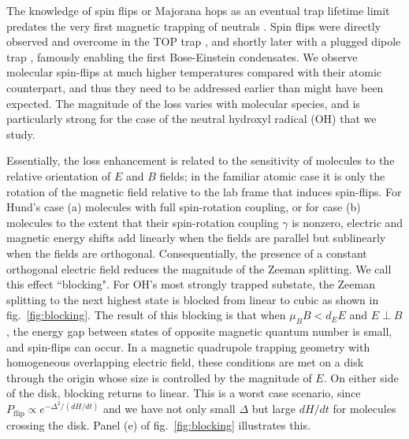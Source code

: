 \documentclass[%
 reprint,
 amsmath,amssymb,
 aps,
prl,
]{revtex4-1}
\begin{document}
The knowledge of spin flips or Majorana hops as an eventual trap lifetime limit predates the very first magnetic trapping of neutrals \cite{Migdall1985}. Spin flips were directly observed and overcome in the TOP trap \cite{Petrich1995}, and shortly later with a plugged dipole trap \cite{Davis1995}, famously enabling the first Bose-Einstein condensates. We observe molecular spin-flips at much higher temperatures compared with their atomic counterpart, and thus they need to be addressed earlier than might have been expected. The magnitude of the loss varies with molecular species, and is particularly strong for the case of the neutral hydroxyl radical (OH) that we study. 

Essentially, the loss enhancement is related to the sensitivity of molecules to the relative orientation of $E$ and $B$ fields;  in the familiar atomic case it is only the rotation of the magnetic field relative to the lab frame that induces spin-flips. For Hund's case (a) molecules with full spin-rotation coupling, or for case (b) molecules to the extent that their spin-rotation coupling $\gamma$ is nonzero, electric and magnetic energy shifts add linearly when the fields are parallel but sublinearly when the fields are orthogonal. Consequentially, the presence of a constant orthogonal electric field reduces the magnitude of the Zeeman splitting. We call this effect ``blocking". For OH's most strongly trapped substate, the Zeeman splitting to the next highest state is blocked from linear to cubic as shown in fig.~\ref{fig:blocking}.  The result of this blocking is that when $\mu_BB < d_EE$ and $E\!\perp\! B$, the energy gap between states of opposite magnetic quantum number is small, and spin-flips can occur. In a magnetic quadrupole trapping geometry with homogeneous overlapping electric field, these conditions are met on a disk through the origin whose size is controlled by the magnitude of $E$. On either side of the disk, blocking returns to linear. This is a worst case scenario, since $P_{\text{flip}}\propto e^{-\Delta^2/(dH/dt)}$ and we have not only small $\Delta$ but large $dH/dt$ for molecules crossing the disk. Panel (e) of fig.~\ref{fig:blocking} illustrates this.
\end{document}
